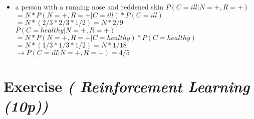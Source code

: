 \documentclass{article}
\begin{document}
\begin{enumerate}
\begin{itemize}
	\item a person with a running nose and reddened skin
		$P(C = ill | N = + , R = +) $ \\ $= N * P (N = + , R = + | C = ill)*P(C = ill)$ \\ $= N*(2/3 * 2/3 * 1/2) = N*2/9$ \\
		$P(C = healthy | N = + , R = +) $ \\ $= N * P (N = + , R = + | C = healthy)*P(C = healthy)$ \\ $= N*(1/3 * 1/3 * 1/2) = N *1/18$\\
		$\to P(C = ill | N = + , R = +) = 4/5$
	\end{itemize}

\end{enumerate}
\section{Exercise \textit{( Reinforcement Learning (10p))}}
\end{document}
